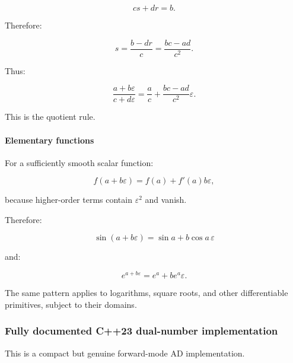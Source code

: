 \[
cs+dr=b.
\]

Therefore:

\[
s=\frac{b-dr}{c} =\frac{bc-ad}{c^2}.
\]

Thus:

\[
\boxed{ \frac{a+b\varepsilon}{c+d\varepsilon} = \frac ac+ \frac{bc-ad}{c^2}\varepsilon }.
\]

This is the quotient rule.

\paragraph{Elementary functions}\label{02-foundations-ii-ch022-elementary-functions}

\hypertarget{02-foundations-ii-ch022-elementary-functions}{}

For a sufficiently smooth scalar function:

\[
f(a+b\varepsilon) = f(a)+f'(a)b\varepsilon,
\]

because higher-order terms contain \(\varepsilon^2\) and vanish.

Therefore:

\[
\boxed{ \sin(a+b\varepsilon) = \sin a+b\cos a\,\varepsilon }
\]

and:

\[
\boxed{ e^{a+b\varepsilon} = e^a+be^a\varepsilon }.
\]

The same pattern applies to logarithms, square roots, and other differentiable primitives, subject to their domains.

\subsubsection{Fully documented C++23 dual-number implementation}\label{02-foundations-ii-ch022-fully-documented-c23-dual-number-implementation}

\hypertarget{02-foundations-ii-ch022-fully-documented-c23-dual-number-implementation}{}

This is a compact but genuine forward-mode AD implementation.

